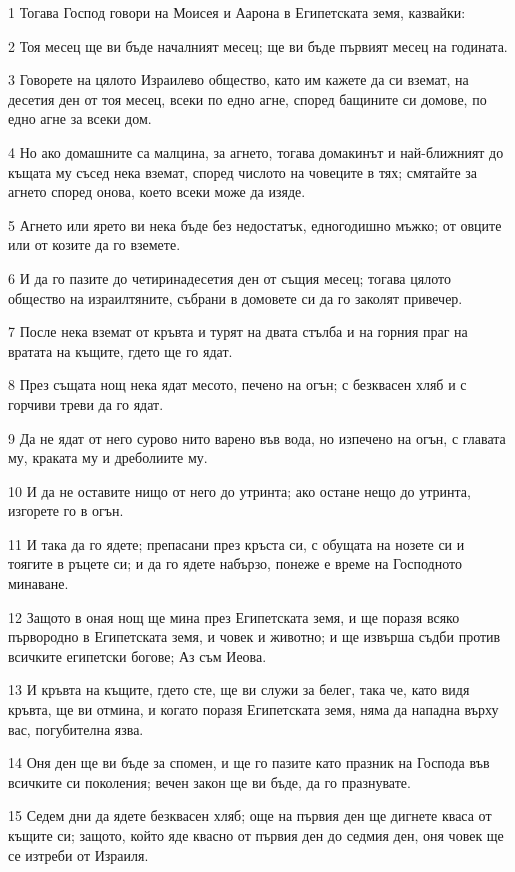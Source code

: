 \par 1 Тогава Господ говори на Моисея и Аарона в Египетската земя, казвайки:
\par 2 Тоя месец ще ви бъде началният месец; ще ви бъде първият месец на годината.
\par 3 Говорете на цялото Израилево общество, като им кажете да си вземат, на десетия ден от тоя месец, всеки по едно агне, според бащините си домове, по едно агне за всеки дом.
\par 4 Но ако домашните са малцина, за агнето, тогава домакинът и най-ближният до къщата му съсед нека вземат, според числото на човеците в тях; смятайте за агнето според онова, което всеки може да изяде.
\par 5 Агнето или ярето ви нека бъде без недостатък, едногодишно мъжко; от овците или от козите да го вземете.
\par 6 И да го пазите до четиринадесетия ден от същия месец; тогава цялото общество на израилтяните, събрани в домовете си да го заколят привечер.
\par 7 После нека вземат от кръвта и турят на двата стълба и на горния праг на вратата на къщите, гдето ще го ядат.
\par 8 През същата нощ нека ядат месото, печено на огън; с безквасен хляб и с горчиви треви да го ядат.
\par 9 Да не ядат от него сурово нито варено във вода, но изпечено на огън, с главата му, краката му и дреболиите му.
\par 10 И да не оставите нищо от него до утринта; ако остане нещо до утринта, изгорете го в огън.
\par 11 И така да го ядете; препасани през кръста си, с обущата на нозете си и тоягите в ръцете си; и да го ядете набързо, понеже е време на Господното минаване.
\par 12 Защото в оная нощ ще мина през Египетската земя, и ще поразя всяко първородно в Египетската земя, и човек и животно; и ще извърша съдби против всичките египетски богове; Аз съм Иеова.
\par 13 И кръвта на къщите, гдето сте, ще ви служи за белег, така че, като видя кръвта, ще ви отмина, и когато поразя Египетската земя, няма да нападна върху вас, погубителна язва.
\par 14 Оня ден ще ви бъде за спомен, и ще го пазите като празник на Господа във всичките си поколения; вечен закон ще ви бъде, да го празнувате.
\par 15 Седем дни да ядете безквасен хляб; още на първия ден ще дигнете кваса от къщите си; защото, който яде квасно от първия ден до седмия ден, оня човек ще се изтреби от Израиля.
